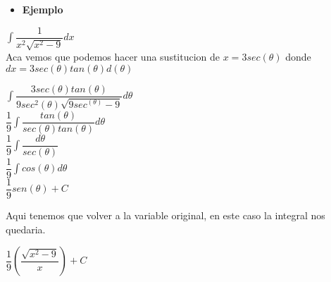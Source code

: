 \documentclass[12pt]{article}
\begin{document}
\begin{itemize}
 \item \textbf{Ejemplo}
\end{itemize}


$\int \dfrac {1}{x^2\sqrt{x^2-9}} dx$\\

Aca vemos que podemos hacer una sustitucion de $x = 3 sec(\theta)$  donde $dx= 3 sec(\theta)tan (\theta) d(\theta)$\\

\addtolength{\baselineskip}{\baselineskip}
\begin{center}
$\int \dfrac {3 sec(\theta) tan(\theta)}{9 sec^2(\theta) \sqrt {9sec^ (\theta)-9}} d\theta$ \\
$\dfrac {1}{9} \int \dfrac {tan (\theta)}{sec(\theta)tan (\theta)} d\theta$\\
$\dfrac {1}{9} \int \dfrac{d\theta}{sec(\theta)}$\\
$\dfrac {1}{9} \int cos(\theta) d\theta$\\
$\dfrac {1}{9} sen (\theta) + C$
\end{center}

Aqui tenemos que volver a la variable original, en este caso la integral nos quedaria.

\begin{center}
$\dfrac {1}{9} (\dfrac {\sqrt{x^2-9}}{x})+ C $
\end{center}
\end{document}
